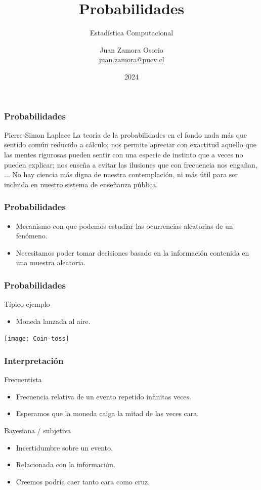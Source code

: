 \documentclass[table]{beamer}
\title{Probabilidades}
\subtitle{Estadística Computacional}
\author[J.Z.O-2024]{Juan Zamora Osorio\\\url{juan.zamora@pucv.cl}}
\institute[PUCV]{Instituto de Estadística\\Pontificia Universidad Cat\'olica de Valpara\'iso}
\date{2024}
\begin{document}
\frame{\titlepage}

\begin{frame}
    \frametitle{Probabilidades}
    \begin{block}{Pierre-Simon Laplace}
        La  teoría  de  la  probabilidades  en  el  fondo  nada  más  que
        sentido  común  reducido  a  cálculo;  nos  permite  apreciar  con  exactitud  aquello  que  las mentes rigurosas pueden sentir con una especie de instinto que a veces no pueden explicar; nos  enseña  a  evitar  las  ilusiones  que  con  frecuencia  nos  engañan, ...  No  hay  ciencia  más
digna  de  nuestra  contemplación,  ni  más  útil  para  ser  incluida  en  nuestro  sistema  de enseñanza pública.
    \end{block}
\end{frame}

\begin{frame}
  \frametitle{Probabilidades}

     \begin{itemize}
			\item Mecanismo con que podemos estudiar las ocurrencias aleatorias de un fenómeno.
        \item Necesitamos poder tomar decisiones basado en la información contenida en una muestra aleatoria.
     \end{itemize}

\end{frame}

\begin{frame}
    \frametitle{Probabilidades}
    \begin{block}{Típico ejemplo}
        \begin{itemize}
            \item Moneda lanzada al aire.
        \end{itemize}
    \end{block}
    \begin{center}
        \texttt{[image: Coin-toss]}
    \end{center}
\end{frame}

\begin{frame}
    \frametitle{Interpretación}
    \begin{block}{Frecuentista}
        \begin{itemize}
            \item Frecuencia relativa de un evento repetido infinitas veces.
            \item Esperamos que la moneda caiga la mitad de las veces cara.
        \end{itemize}
    \end{block}
    \begin{block}{Bayesiana / subjetiva}
        \begin{itemize}
            \item Incertidumbre sobre un evento.
            \item Relacionada con la información.
            \item Creemos podría caer tanto cara como cruz.
        \end{itemize}
    \end{block}
\end{frame}
\end{document}
